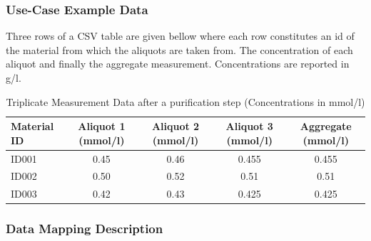 \subsubsection*{Use-Case Example Data}
Three rows of a CSV table are given bellow where each row constitutes an id of the material from which the aliquots are taken from. The concentration of each aliquot and finally the aggregate measurement. 
Concentrations are reported in g/l.

\begin{table}[ht]
\centering
\caption{Triplicate Measurement Data after a purification step (Concentrations in mmol/l)}
\label{tab:triplicate_measurements}
\begin{tabular}{lccc c}
\toprule
\textbf{Material ID} & \textbf{Aliquot 1 (mmol/l)} & \textbf{Aliquot 2 (mmol/l)} & \textbf{Aliquot 3 (mmol/l)} & \textbf{Aggregate (mmol/l)} \\
\midrule
ID001 & 0.45 & 0.46 & 0.455 & 0.455 \\
ID002 & 0.50 & 0.52 & 0.51  & 0.51  \\
ID003 & 0.42 & 0.43 & 0.425 & 0.425 \\
\bottomrule
\end{tabular}
\end{table}

\subsubsection*{Data Mapping Description}

